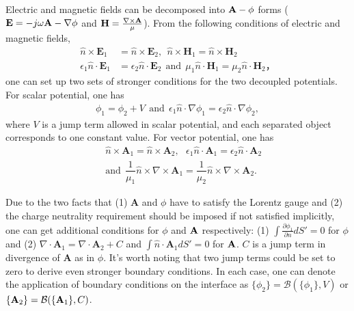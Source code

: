\documentclass[conference]{IEEEtran}
\begin{document}
Electric and magnetic fields can be decomposed into ${\bf A}-\phi$ forms (${\bf E} = -j\omega {\bf A} - \nabla \phi$ and 
${\bf H} = \frac{\nabla \times {\bf A}}{\mu} $).
From the following conditions of electric and magnetic fields,
\begin{equation}
\begin{aligned}
\hat{n} \times \mathbf{E}_1 & = \hat{n} \times \mathbf{E}_2   
,~~ \hat{n} \times \mathbf{H}_1 = \hat{n} \times \mathbf{H}_2   \\
\epsilon_1 \hat{n} \cdot \mathbf{E}_1 &=  \epsilon_2 \hat{n} \cdot \mathbf{E}_2   
~~\text{and}~~ \mu_1 \hat{n} \cdot \mathbf{H}_1 =\mu_2\hat{n} \cdot \mathbf{H}_2   ，
\end{aligned}
\end{equation}
one can set up two sets of stronger conditions for the two decoupled potentials. For scalar potential, one has
\begin{equation}
\label{equ:bc_die_phi}
\begin{aligned}
\phi_1   = \phi_2 + V  
~~\text{and}~~ \epsilon_1 \hat{n} \cdot \nabla  \phi_1  = \epsilon_2  \hat{n} \cdot  \nabla \phi_2  ,
\end{aligned}
\end{equation}
where $V$ is a jump term allowed in scalar potential, and each separated object corresponds to one constant value.
For vector potential, one has
\begin{equation}
\label{equ:bc_die_a}
\begin{aligned}
& \hat{n} \times \mathbf{A}_1  =  \hat{n} \times \mathbf{A}_2, ~~~
\epsilon_1 \hat{n} \cdot  \mathbf{A}_1  =  \epsilon_2  \hat{n} \cdot  \mathbf{A}_2 \\
~~& \text{and}~~\dfrac{1}{\mu_1}\hat{n}\times \nabla \times \mathbf{A}_1  = \dfrac{1}{\mu_2} \hat{n}\times \nabla \times \mathbf{A}_2  .   
\end{aligned}
\end{equation}

Due to the two facts that (1) $\mathbf{A}$ and $\phi$ have to satisfy the Lorentz gauge and (2) the charge neutrality requirement should be imposed if not satisfied implicitly, one can get additional conditions for $\phi$ and ${\bf A}$ respectively: (1)
$\int \frac{\partial \phi_1  }{\partial n} dS' = 0 $ for $\phi$ and (2) 
$\nabla \cdot  \mathbf{A}_1  =  \nabla \cdot  \mathbf{A}_2  + C $
and $ \int \hat{n} \cdot  \mathbf{A}_1  dS' =  0  $ for ${\bf A}$.
$C$ is a jump term in divergence of $\mathbf{A}$ as in $\phi$. It's worth noting that two jump terms could be set to zero to derive even stronger boundary conditions. In each case, one can denote the application of boundary conditions on the interface as $\{ \phi_2\} = \mathcal{B}(\{ \phi_1\},V)$ or $\{ {\bf A}_2 \} = {\bf \mathcal{B}}(\{ {\bf A}_1\},C)$.
\end{document}
